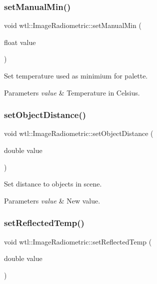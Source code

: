 \subsubsection{\texorpdfstring{set\+Manual\+Min()}{setManualMin()}}
{\footnotesize\ttfamily void wtl\+::\+Image\+Radiometric\+::set\+Manual\+Min (\begin{DoxyParamCaption}\item[{float}]{value }\end{DoxyParamCaption})}



Set temperature used as minimium for palette. 


\begin{DoxyParams}{Parameters}
{\em value} & Temperature in Celsius. \\
\hline
\end{DoxyParams}
\mbox{\label{classwtl_1_1_image_radiometric_ad1e5e233f3df59dff8fef5c37f4d1dc1}} 
\subsubsection{\texorpdfstring{set\+Object\+Distance()}{setObjectDistance()}}
{\footnotesize\ttfamily void wtl\+::\+Image\+Radiometric\+::set\+Object\+Distance (\begin{DoxyParamCaption}\item[{double}]{value }\end{DoxyParamCaption})}



Set distance to objects in scene. 


\begin{DoxyParams}{Parameters}
{\em value} & New value. \\
\hline
\end{DoxyParams}
\mbox{\label{classwtl_1_1_image_radiometric_acade58f2c02c2a37fce92f2f085d28f8}} 
\subsubsection{\texorpdfstring{set\+Reflected\+Temp()}{setReflectedTemp()}}
{\footnotesize\ttfamily void wtl\+::\+Image\+Radiometric\+::set\+Reflected\+Temp (\begin{DoxyParamCaption}\item[{double}]{value }\end{DoxyParamCaption})}



